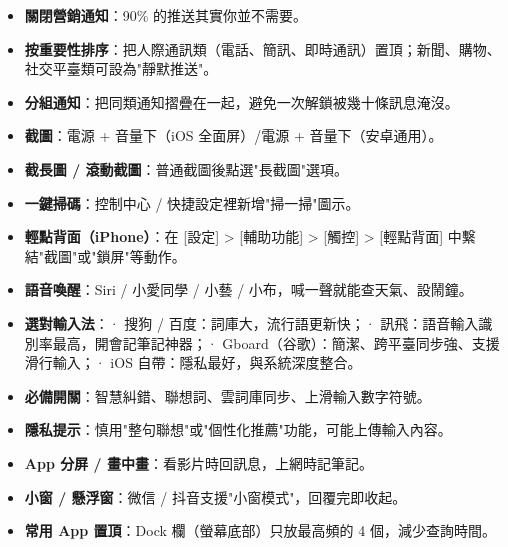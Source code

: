 
\begin{itemize}
  \item \textbf{關閉營銷通知}：90\% 的推送其實你並不需要。
  \item \textbf{按重要性排序}：把人際通訊類（電話、簡訊、即時通訊）置頂；新聞、購物、社交平臺類可設為"靜默推送"。
  \item \textbf{分組通知}：把同類通知摺疊在一起，避免一次解鎖被幾十條訊息淹沒。
\end{itemize}


\begin{itemize}
  \item \textbf{截圖}：電源 + 音量下（iOS 全面屏）/電源 + 音量下（安卓通用）。
  \item \textbf{截長圖 / 滾動截圖}：普通截圖後點選"長截圖"選項。
  \item \textbf{一鍵掃碼}：控制中心 / 快捷設定裡新增"掃一掃"圖示。
  \item \textbf{輕點背面（iPhone）}：在 [設定] > [輔助功能] > [觸控] > [輕點背面] 中繫結"截圖"或"鎖屏"等動作。
  \item \textbf{語音喚醒}：Siri / 小愛同學 / 小藝 / 小布，喊一聲就能查天氣、設鬧鐘。
\end{itemize}


\begin{itemize}
  \item \textbf{選對輸入法}：\newline · 搜狗 / 百度：詞庫大，流行語更新快；\newline · 訊飛：語音輸入識別率最高，開會記筆記神器；\newline · Gboard（谷歌）：簡潔、跨平臺同步強、支援滑行輸入；\newline · iOS 自帶：隱私最好，與系統深度整合。
  \item \textbf{必備開關}：智慧糾錯、聯想詞、雲詞庫同步、上滑輸入數字符號。
  \item \textbf{隱私提示}：慎用"整句聯想"或"個性化推薦"功能，可能上傳輸入內容。
\end{itemize}


\begin{itemize}
  \item \textbf{App 分屏 / 畫中畫}：看影片時回訊息，上網時記筆記。
  \item \textbf{小窗 / 懸浮窗}：微信 / 抖音支援"小窗模式"，回覆完即收起。
  \item \textbf{常用 App 置頂}：Dock 欄（螢幕底部）只放最高頻的 4 個，減少查詢時間。
\end{itemize}

